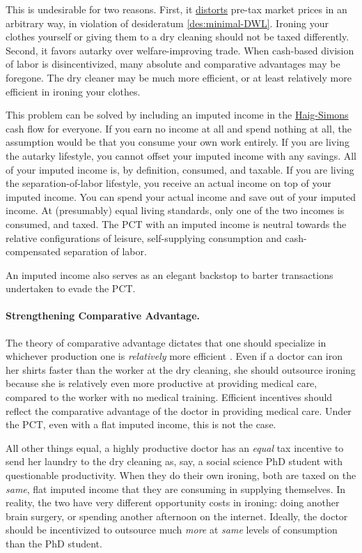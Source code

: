 This is undesirable for two reasons.
First, it \hyperref[des:minimal-DWL]{distorts} pre-tax market prices in an arbitrary way, in violation of desideratum \ref{des:minimal-DWL}.
Ironing your clothes yourself or giving them to a dry cleaning should not be taxed differently.
Second, it favors autarky over welfare-improving trade.
When cash-based division of labor is disincentivized, many absolute and comparative advantages may be foregone.
The dry cleaner may be much more efficient, or at least relatively more efficient in ironing your clothes.

This problem can be solved by including an imputed income in the \hyperref[eq:HaigSimonsPCT]{Haig-Simons} cash flow for everyone.
If you earn no income at all and spend nothing at all, the assumption would be that you consume your own work entirely.
If you are living the autarky lifestyle, you cannot offset your imputed income with any savings.
All of your imputed income is, by definition, consumed, and taxable.
If you are living the separation-of-labor lifestyle, you receive an actual income on top of your imputed income.
You can spend your actual income and save out of your imputed income.
At (presumably) equal living standards, only one of the two incomes is consumed, and taxed.
The PCT with an imputed income is neutral towards the relative configurations of leisure, self-supplying consumption and cash-compensated separation of labor.

An imputed income also serves as an elegant backstop to barter transactions undertaken to evade the PCT.

\paragraph{Strengthening Comparative Advantage.}
The theory of comparative advantage dictates that one should specialize in whichever production one is \emph{relatively} more efficient \citep{Ricardo1817}.
Even if a doctor can iron her shirts faster than the worker at the dry cleaning, she should outsource ironing because she is relatively even more productive at providing medical care, compared to the worker with no medical training.
Efficient incentives should reflect the comparative advantage of the doctor in providing medical care.
Under the PCT, even with a flat imputed income, this is not the case.

All other things equal, a highly productive doctor has an \emph{equal} tax incentive to send her laundry to the dry cleaning as, say, a social science PhD student with questionable productivity.
When they do their own ironing, both are taxed on the \emph{same}, flat imputed income that they are consuming in supplying themselves.
In reality, the two have very different opportunity costs in ironing:
doing another brain surgery, or spending another afternoon on the internet.
Ideally, the doctor should be incentivized to outsource much \emph{more} at \emph{same} levels of consumption than the PhD student.

